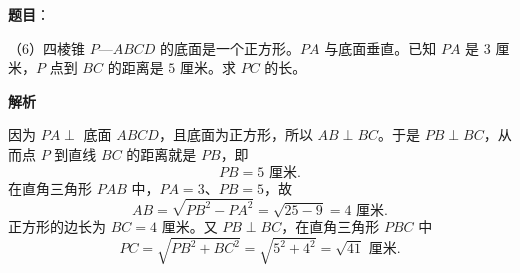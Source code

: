 \begin{answer}

\textbf{题目}：

（6）四棱锥 $P$—$ABCD$ 的底面是一个正方形。$PA$ 与底面垂直。已知 $PA$ 是 $3$ 厘米，$P$ 点到 $BC$ 的距离是 $5$ 厘米。求 $PC$ 的长。
\nopagebreak[4]
\begin{center}\end{center}
\nopagebreak[4]
\textbf{解析}

因为 $PA\perp$ 底面 $ABCD$，且底面为正方形，所以 $AB\perp BC$。于是 $PB\perp BC$，从而点 $P$ 到直线 $BC$ 的距离就是 $PB$，即
\nopagebreak[4]
\[
PB=5\text{ 厘米}.
\]
在直角三角形 $PAB$ 中，$PA=3$、$PB=5$，故
\nopagebreak[4]
\[
AB=\sqrt{PB^2-PA^2}=\sqrt{25-9}=4\text{ 厘米}.
\]
正方形的边长为 $BC=4$ 厘米。又 $PB\perp BC$，在直角三角形 $PBC$ 中
\nopagebreak[4]
\[
PC=\sqrt{PB^2+BC^2}=\sqrt{5^2+4^2}=\sqrt{41}\text{ 厘米}.
\]


\end{answer}

